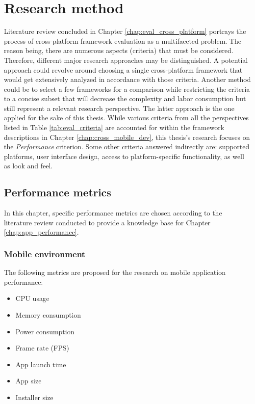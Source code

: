 
\chapter{Research method}

Literature review concluded in Chapter \ref{chap:eval_cross_platform} portrays the process of cross-platform framework evaluation as a multifaceted problem. The reason being, there are numerous aspects (criteria) that must be considered. Therefore, different major research approaches may be distinguished. A potential approach could revolve around choosing a single cross-platform framework that would get extensively analyzed in accordance with those criteria. Another method could be to select a few frameworks for a comparison while restricting the criteria to a concise subset that will decrease the complexity and labor consumption but still represent a relevant research perspective. The latter approach is the one applied for the sake of this thesis. While various criteria from all the perspectives listed in Table \ref{tab:eval_criteria} are accounted for within the framework descriptions in Chapter \ref{chap:cross_mobile_dev}, this thesis's research focuses on the \emph{Performance} criterion. Some other criteria answered indirectly are: supported platforms, user interface design, access to platform-specific functionality, as well as look and feel.

\section{Performance metrics}

In this chapter, specific performance metrics are chosen according to the literature review conducted to provide a knowledge base for Chapter \ref{chap:app_performance}.

\subsection{Mobile environment}

The following metrics are proposed for the research on mobile application performance:

\begin{itemize}
    \item CPU usage
    \item Memory consumption
    \item Power consumption
    \item Frame rate (FPS)
    \item App launch time
    \item App size
    \item Installer size
\end{itemize}

